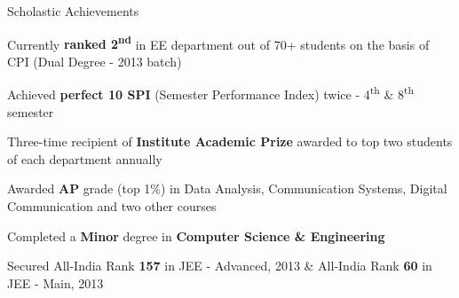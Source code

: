 \documentclass{resume} %
\begin{document}

\vskip 1.18in



\begin{rSection}{Scholastic Achievements}
\begin{rSubsection}{}{}{}{}
\vspace{-1 mm}
\item Currently \textbf{ranked 2\textsuperscript{nd}} in EE department out of 70+ students on the basis of CPI (Dual Degree - 2013 batch) 
\item Achieved \textbf{perfect 10 SPI} (Semester Performance Index) twice - 4\textsuperscript{th} \& 8\textsuperscript{th} semester
\item Three-time recipient of \textbf{Institute Academic Prize} awarded to top two students of each department annually
\item Awarded \textbf{AP} grade (top 1\%) in Data Analysis, Communication Systems, Digital Communication and two other courses
\item Completed a \textbf{Minor} degree in \textbf{Computer Science \& Engineering}
\item Secured All-India Rank \textbf{157} in JEE - Advanced, 2013 \& All-India Rank \textbf{60} in  JEE - Main, 2013

\end{rSubsection}

\end{rSection}
\end{document}
